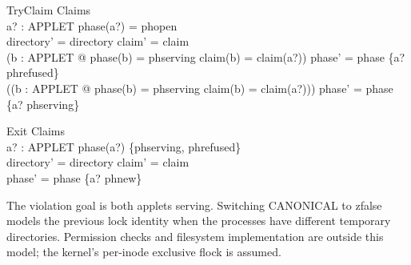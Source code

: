 \documentclass[a4paper,10pt]{article}
\begin{document}
\begin{schema}{TryClaim}
\Delta Claims \\
a? : APPLET
\where
phase(a?) = phopen \\
directory' = directory \land claim' = claim \\
(\exists b : APPLET @ phase(b) = phserving \land claim(b) = claim(a?))
  \implies phase' = phase \oplus \{a? \mapsto phrefused\} \\
(\lnot (\exists b : APPLET @ phase(b) = phserving \land claim(b) = claim(a?)))
  \implies phase' = phase \oplus \{a? \mapsto phserving\}
\end{schema}

\begin{schema}{Exit}
\Delta Claims \\
a? : APPLET
\where
phase(a?) \in \{phserving, phrefused\} \\
directory' = directory \land claim' = claim \\
phase' = phase \oplus \{a? \mapsto phnew\}
\end{schema}

The violation goal is both applets serving. Switching CANONICAL to zfalse
models the previous lock identity when the processes have different temporary
directories. Permission checks and filesystem implementation are outside
this model; the kernel's per-inode exclusive flock is assumed.
\end{document}

